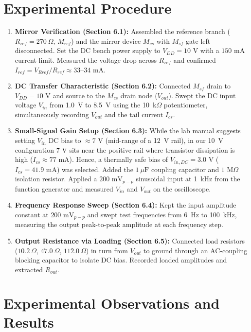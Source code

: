 \documentclass[11pt, a4paper]{article}
\begin{document}
\section{Experimental Procedure}
\begin{enumerate}
    \item \textbf{Mirror Verification (Section 6.1):} Assembled the reference branch ($R_{ref} = 270\ \Omega$, $M_{ref}$) and the mirror device $M_{cs}$ with $M_{sf}$ gate left disconnected. Set the DC bench power supply to $V_{DD} = 10\text{ V}$ with a $150\text{ mA}$ current limit. Measured the voltage drop across $R_{ref}$ and confirmed $I_{ref} = V_{Rref}/R_{ref} \approx 33\text{--}34\text{ mA}$.
    \item \textbf{DC Transfer Characteristic (Section 6.2):} Connected $M_{sf}$ drain to $V_{DD} = 10\text{ V}$ and source to the $M_{cs}$ drain node ($V_{out}$). Swept the DC input voltage $V_{in}$ from 1.0~V to 8.5~V using the 10~k$\Omega$ potentiometer, simultaneously recording $V_{out}$ and the tail current $I_{cs}$.
    \item \textbf{Small-Signal Gain Setup (Section 6.3):} While the lab manual suggests setting $V_{in}$ DC bias to $\approx 7\text{ V}$ (mid-range of a 12~V rail), in our 10~V configuration $7\text{ V}$ sits near the positive rail where transistor dissipation is high ($I_{cs} \approx 77\text{ mA}$). Hence, a thermally safe bias of $V_{in,DC} = 3.0\text{ V}$ ($I_{cs} = 41.9\text{ mA}$) was selected. Added the $1\ \mu\text{F}$ coupling capacitor and $1\text{ M}\Omega$ isolation resistor. Applied a $200\text{ mV}_{p-p}$ sinusoidal input at 1~kHz from the function generator and measured $V_{in}$ and $V_{out}$ on the oscilloscope.
    \item \textbf{Frequency Response Sweep (Section 6.4):} Kept the input amplitude constant at $200\text{ mV}_{p-p}$ and swept test frequencies from 6~Hz to 100~kHz, measuring the output peak-to-peak amplitude at each frequency step.
    \item \textbf{Output Resistance via Loading (Section 6.5):} Connected load resistors ($10.2\ \Omega$, $47.0\ \Omega$, $112.0\ \Omega$) in turn from $V_{out}$ to ground through an AC-coupling blocking capacitor to isolate DC bias. Recorded loaded amplitudes and extracted $R_{out}$.
\end{enumerate}

\section{Experimental Observations and Results}
\end{document}
